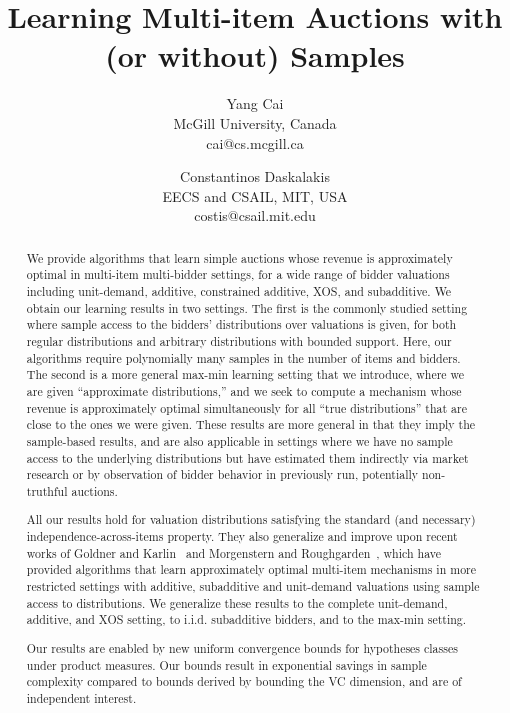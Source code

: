 \documentclass[11pt]{article}
\title{Learning Multi-item Auctions with (or without) Samples}
\author{Yang Cai\\
McGill University, Canada\\
cai@cs.mcgill.ca \and Constantinos Daskalakis\\ EECS and CSAIL, MIT, USA\\ costis@csail.mit.edu}
\begin{document}
\maketitle

\begin{abstract}
We provide algorithms that learn simple auctions whose revenue is approximately optimal in multi-item multi-bidder settings, for a wide range of bidder valuations including unit-demand, additive, constrained additive, XOS, and subadditive. We obtain our learning results in two settings. The first is the commonly studied setting where sample access to the bidders' distributions  over valuations is given, for both regular distributions and arbitrary distributions with bounded support. Here, our algorithms require polynomially many samples in the number of items and bidders. The second is a more general max-min learning setting that we introduce, where we are given ``approximate distributions,'' and we seek to compute a mechanism whose revenue is approximately optimal simultaneously for all ``true distributions'' that are close to the ones we were given. These results are more general in that they imply the sample-based results, and are also applicable in settings where we have no sample access to the underlying distributions but  have estimated them indirectly via market research or by observation of bidder behavior in previously run, potentially non-truthful auctions. 

All our results hold for valuation distributions satisfying the standard (and necessary) independence-across-items property. They also generalize and improve upon recent works of Goldner and Karlin~\cite{GoldnerK16} and Morgenstern and Roughgarden~\cite{MorgensternR16}, which have provided algorithms that learn approximately optimal multi-item mechanisms in more restricted settings with additive, subadditive and unit-demand valuations using sample access to distributions. We generalize these results to the complete unit-demand, additive, and XOS setting, to i.i.d. subadditive bidders, and to the max-min setting. 

Our results are enabled by new uniform convergence bounds for hypotheses classes under product measures. Our bounds result in exponential savings in sample complexity compared to bounds derived by bounding the VC dimension, and are of independent interest.
\end{abstract}
\thispagestyle{empty}
\addtocounter{page}{-1}
\newpage









\appendix

\newpage
%
	

\end{document}
